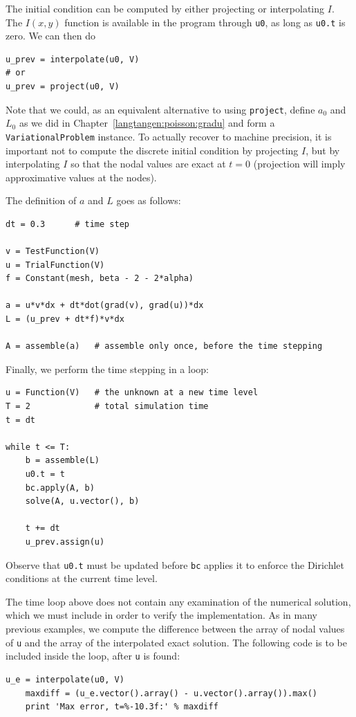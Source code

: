 The initial condition can be computed by either projecting or interpolating
$I$. The $I(x,y)$ function is available in the program through
{\fontsize{12pt}{12pt}\verb!u0!},
as long as {\fontsize{12pt}{12pt}\verb!u0.t!} is zero.
We can then do
\begin{Verbatim}[fontsize=\fontsize{10pt}{10pt},tabsize=8,baselinestretch=1.05,
fontfamily=tt,xleftmargin=7mm]
u_prev = interpolate(u0, V)
# or
u_prev = project(u0, V)
\end{Verbatim}
\noindent
Note that we could, as an equivalent alternative to using {\fontsize{12pt}{12pt}\texttt{project}}, define
$a_0$ and $L_0$ as we did in Chapter~\ref{langtangen:poisson:gradu} and form
a {\fontsize{12pt}{12pt}\texttt{VariationalProblem}} instance.
To actually recover  to machine
precision, it is important not to compute the discrete initial condition by
projecting $I$, but by interpolating $I$ so that the nodal values are
exact at $t=0$ (projection will imply approximative values at the nodes).


The definition of $a$ and $L$ goes as follows:
\begin{Verbatim}[fontsize=\fontsize{10pt}{10pt},tabsize=8,baselinestretch=1.05,
fontfamily=tt,xleftmargin=7mm]
dt = 0.3      # time step

v = TestFunction(V)
u = TrialFunction(V)
f = Constant(mesh, beta - 2 - 2*alpha)

a = u*v*dx + dt*dot(grad(v), grad(u))*dx
L = (u_prev + dt*f)*v*dx

A = assemble(a)   # assemble only once, before the time stepping
\end{Verbatim}
\noindent

Finally, we perform the time stepping in a loop:
\begin{Verbatim}[fontsize=\fontsize{10pt}{10pt},tabsize=8,baselinestretch=1.05,
fontfamily=tt,xleftmargin=7mm]
u = Function(V)   # the unknown at a new time level
T = 2             # total simulation time
t = dt

while t <= T:
    b = assemble(L)
    u0.t = t
    bc.apply(A, b)
    solve(A, u.vector(), b)

    t += dt
    u_prev.assign(u)
\end{Verbatim}
\noindent
Observe that {\fontsize{12pt}{12pt}\verb!u0.t!} must be updated before {\fontsize{12pt}{12pt}\texttt{bc}} applies
it to enforce the Dirichlet conditions at the current time level.

The time loop above does not contain any examination of the numerical
solution, which we must include in order to verify the implementation.
As in many previous examples, we compute the difference between
the array of nodal
values of {\fontsize{12pt}{12pt}\texttt{u}} and the array of the interpolated exact solution.
The following code is to be included inside the loop, after {\fontsize{12pt}{12pt}\texttt{u}}
is found:
\begin{Verbatim}[fontsize=\fontsize{10pt}{10pt},tabsize=8,baselinestretch=1.05,
fontfamily=tt,xleftmargin=7mm]
    u_e = interpolate(u0, V)
    maxdiff = (u_e.vector().array() - u.vector().array()).max()
    print 'Max error, t=%-10.3f:' % maxdiff
\end{Verbatim}
\noindent

